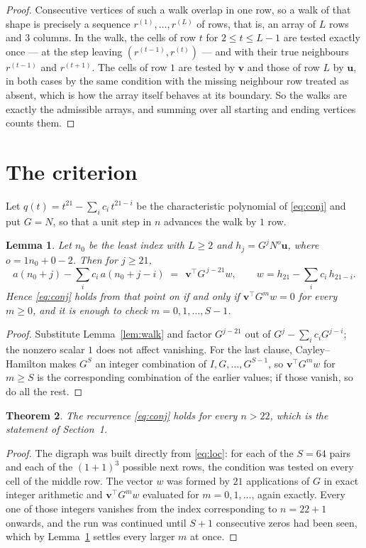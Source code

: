 \documentclass[11pt,a4paper]{article}
\theoremstyle{plain}
\newtheorem{theorem}{Theorem}
\newtheorem{lemma}[theorem]{Lemma}
\theoremstyle{definition}
\begin{document}
\begin{proof}
Consecutive vertices of such a walk overlap in one row, so a walk of that shape is
precisely a sequence $r^{(1)},\dots,r^{(L)}$ of rows, that is, an array of $L$ rows
and $3$ columns. In the walk, the cells of row $t$ for $2\le t\le L-1$ are tested
exactly once --- at the step leaving $(r^{(t-1)},r^{(t)})$ --- and with their true
neighbours $r^{(t-1)}$ and $r^{(t+1)}$. The cells of row $1$ are tested by
$\mathbf{v}$ and those of row $L$ by $\mathbf{u}$, in both cases by the same condition
with the missing neighbour row treated as absent, which is how the array itself behaves at
its boundary. So the walks are exactly the admissible arrays, and summing over all starting
and ending vertices counts them.
\end{proof}

\section{The criterion}

Let $q(t)=t^{21}-\sum_i c_i\,t^{21-i}$ be the characteristic polynomial of
\eqref{eq:conj} and put $G=N$, so that a unit step in $n$ advances the walk by
$1$ row.

\begin{lemma}\label{lem:crit}
Let $n_0$ be the least index with $L\ge2$ and $h_j=G^{j}N^{o}\mathbf{u}$, where
$o=1n_0+0-2$. Then for $j\ge21$,
\[
a(n_0+j)-\sum_i c_i\,a(n_0+j-i)\;=\;\,\mathbf{v}^{\!\top}G^{\,j-21}w,
\qquad w=h_{21}-\sum_i c_i\,h_{21-i} .
\]
Hence \eqref{eq:conj} holds from that point on if and only if
$\mathbf{v}^{\!\top}G^{m}w=0$ for every $m\ge0$, and it is enough to check
$m=0,1,\dots,S-1$.
\end{lemma}

\begin{proof}
Substitute Lemma~\ref{lem:walk} and factor $G^{j-21}$ out of
$G^{j}-\sum_ic_iG^{j-i}$; the nonzero scalar $1$ does not affect
vanishing. For the last clause, Cayley--Hamilton makes $G^{S}$ an integer combination of
$I,G,\dots,G^{S-1}$, so $\mathbf{v}^{\!\top}G^{m}w$ for $m\ge S$ is the corresponding
combination of the earlier values; if those vanish, so do all the rest.
\end{proof}

\begin{theorem}
The recurrence \eqref{eq:conj} holds for every $n>22$, which is the statement of
Section~1.
\end{theorem}

\begin{proof}
The digraph was built directly from \eqref{eq:loc}: for each of the $S=64$ pairs and each
of the $(1+1)^{3}$ possible next rows, the condition was tested on every cell of
the middle row. The vector $w$ was formed by $21$ applications of $G$ in exact integer
arithmetic and $\mathbf{v}^{\!\top}G^{m}w$ evaluated for $m=0,1,\dots$, again exactly.
Every one of those integers vanishes from the index corresponding to $n=22+1$ onwards,
and the run was continued until $S+1$ consecutive zeros had been seen, which by
Lemma~\ref{lem:crit} settles every larger $m$ at once.
\end{proof}
\end{document}
